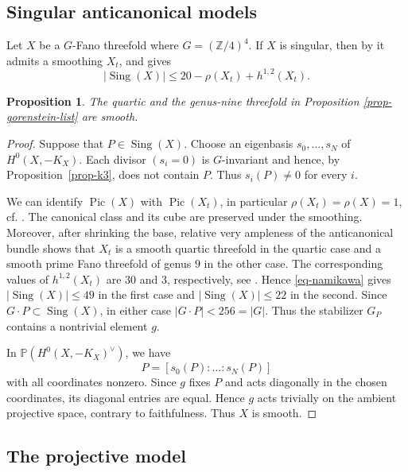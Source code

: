 \documentclass[10pt,oneside,reqno]{amsart}
\numberwithin{equation}{section}
\newtheorem{proposition}[theorem]{Proposition}
\theoremstyle{definition}
\newcommand{\Pic}{\operatorname{Pic}}
\newcommand{\Sing}{\operatorname{Sing}}
\begin{document}
\subsection{Singular anticanonical models}
Let $X$ be a $G$-Fano threefold where $G=(\mathbb{Z}/4)^4$.  If $X$ is
singular, then by \cite[Theorem~11]{Namikawa} it admits a smoothing
$X_t$, and \cite[Theorem~13]{Namikawa} gives
\begin{equation}
 |\Sing(X)|\leq20-\rho(X_t)+h^{1,2}(X_t).
 \label{eq-namikawa}
\end{equation}

\begin{proposition}
\label{prop-embedded-smooth}
The quartic and the genus-nine threefold in Proposition
\ref{prop-gorenstein-list} are smooth.
\end{proposition}

\begin{proof}
Suppose that $P\in\Sing(X)$.  Choose an eigenbasis
$s_0,\ldots,s_N$ of $H^0(X,-K_X)$.  Each divisor $(s_i=0)$ is
$G$-invariant and hence, by Proposition~\ref{prop-k3}, does not
contain $P$.  Thus $s_i(P)\neq0$ for every $i$.

We can identify
$\Pic(X)$ with $\Pic(X_t)$, in particular $\rho(X_t)=\rho(X)=1$, cf.
\cite[Theorem~1.4]{JahnkeRadloff}.
The canonical class and its cube are preserved under the smoothing.
Moreover, after shrinking the base, relative very ampleness of the
anticanonical bundle shows that $X_t$ is a smooth quartic threefold in
the quartic case and a smooth prime Fano threefold of genus $9$ in the
other case.  The corresponding values of $h^{1,2}(X_t)$ are $30$ and
$3$, respectively, see \cite[Table~12.2]{IP}.  Hence
\eqref{eq-namikawa} gives $|\Sing(X)|\leq49$ in the first case and
$|\Sing(X)|\leq22$ in the second.  Since
$G\cdot P\subset\Sing(X)$, in either case
$|G\cdot P|<256=|G|$.  Thus the stabilizer $G_P$ contains a nontrivial
element $g$.

In $\mathbb{P}(H^0(X,-K_X)^\vee)$, we have
\[
 P=[s_0(P):\ldots:s_N(P)]
\]
with all coordinates nonzero.  Since $g$ fixes $P$ and acts diagonally
in the chosen coordinates, its diagonal entries are equal.  Hence $g$
acts trivially on the ambient projective space, contrary to
faithfulness.  Thus $X$ is smooth.
\end{proof}

\subsection{The projective model}
\end{document}
